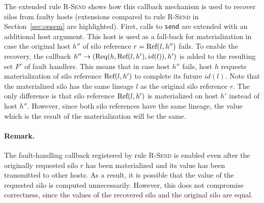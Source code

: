 The extended rule \textsc{R-Send} shows how this callback mechanism is
used to recover silos from faulty hosts (extensions compared to rule
\textsc{R-Send} in Section~\ref{sec:opsem} are highlighted). First,
calls to \verb|send| are extended with an additional host
argument. This host is used as a fall-back for materialization in case
the original host $h''$ of silo reference $r = {\textrm{Ref}(l, h'')}$
fails. To enable the recovery, the callback $h'' \rightarrow ({\textrm{Req}(h, \textrm{Ref}(l, h'), id(l)) }, h')$ is added to the resulting set $F'$ of
fault handlers. This means that in case host $h''$ fails, host $h$
requests materialization of silo reference ${\textrm{Ref}(l, h')}$ to complete
its future $id(l)$. Note that the materialized silo has the same
lineage $l$ as the original silo reference $r$. The only difference is
that silo reference ${\textrm{Ref}(l, h')}$ is materialized on host $h'$
instead of host $h''$. However, since both silo references have the
same lineage, the value which is the result of the materialization
will be the same.

\paragraph{Remark.} The fault-handling callback registered by rule \textsc{R-Send} is enabled
even after the originally requested silo $r$ has been materialized and
its value has been transmitted to other hosts. As a result, it is
possible that the value of the requested silo is computed
unnecessarily. However, this does not compromise correctness, since
the values of the recovered silo and the original silo are equal.



